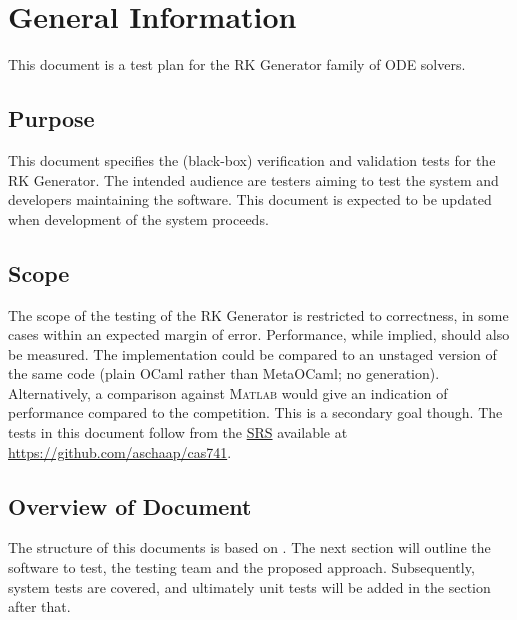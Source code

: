 \documentclass[12pt, titlepage]{article}
\begin{document}
\newpage



\section{General Information}

This document is a test plan for the RK Generator family of ODE solvers.

\subsection{Purpose}

This document specifies the (black-box) verification and validation tests for 
the RK Generator. The intended audience are testers aiming to test the system 
and developers maintaining the software. This document is expected to be 
updated when development of the system proceeds.

\subsection{Scope}

The scope of the testing of the RK Generator is restricted to correctness, in 
some cases within an expected margin of error. Performance, while implied, 
should also be measured. The implementation could be compared to an unstaged 
version of the same code (plain OCaml rather than MetaOCaml; no generation). 
Alternatively, a comparison against \textsc{\textsc{Matlab}} would give an 
indication of 
performance compared to the competition. This is a secondary goal though.
The tests in this document follow from the \href{../SRS/CA.pdf}{SRS} available 
at \url{https://github.com/aschaap/cas741}.

\subsection{Overview of Document}
The structure of this documents is based on \cite{Smith2006}. The next section 
will outline the software to test, the testing team and the proposed approach.
Subsequently, system tests are covered, and ultimately unit tests will be added 
in the section after that. 
\end{document}
